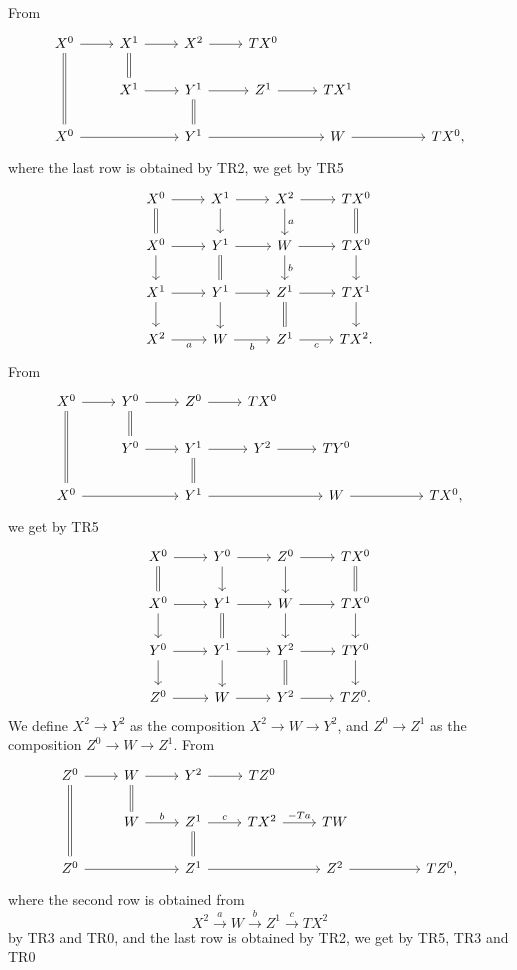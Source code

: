 \documentclass[12pt]{article}
\theoremstyle{remark}
\begin{document}
From 
$$
\begin{tikzcd}
X^0\ar[equal]{dd}\ar{r}&X^1\ar[equal]{d}\ar{r}&X^2\ar{r}&TX^0\\
&X^1\ar{r}&Y^1\ar[equal]{d}\ar{r}&Z^1\ar{r}&TX^1\\
X^0\ar{rr}&&Y^1\ar{rr}&&W\ar{rr}&&TX^0,
\end{tikzcd}
$$
where the last row is obtained by TR2, we get by TR5
\begin{equation}\label{v1}
\begin{tikzcd}
X^0\ar{r}\ar[equal]{d}&X^1\ar{d}\ar{r}&X^2\ar{d}{a}\ar{r}&TX^0\ar[equal]{d}\\
X^0\ar{d}\ar{r}&Y^1\ar{r}\ar[equal]{d}&W\ar{d}{b}\ar{r}&TX^0\ar{d}\\
X^1\ar{d}\ar{r}&Y^1\ar{d}\ar{r}&Z^1\ar{r}\ar[equal]{d}&TX^1\ar{d}\\
X^2\ar{r}[swap]{a}&W\ar{r}[swap]{b}&Z^1\ar{r}[swap]{c}&TX^2.
\end{tikzcd}
\end{equation}
%
From 
$$
\begin{tikzcd}
X^0\ar[equal]{dd}\ar{r}&Y^0\ar[equal]{d}\ar{r}&Z^0\ar{r}&TX^0\\
&Y^0\ar{r}&Y^1\ar[equal]{d}\ar{r}&Y^2\ar{r}&TY^0\\
X^0\ar{rr}&&Y^1\ar{rr}&&W\ar{rr}&&TX^0,
\end{tikzcd}
$$
we get by TR5
\begin{equation}\label{v2}
\begin{tikzcd}
X^0\ar{r}\ar[equal]{d}&Y^0\ar{d}\ar{r}&Z^0\ar{d}\ar{r}&TX^0\ar[equal]{d}\\
X^0\ar{d}\ar{r}&Y^1\ar{r}\ar[equal]{d}&W\ar{d}\ar{r}&TX^0\ar{d}\\
Y^0\ar{d}\ar{r}&Y^1\ar{d}\ar{r}&Y^2\ar{r}\ar[equal]{d}&TY^0\ar{d}\\
Z^0\ar{r}&W\ar{r}&Y^2\ar{r}&TZ^0.
\end{tikzcd}
\end{equation}
%
We define $X^2\to Y^2$ as the composition $X^2\to W\to Y^2$, and $Z^0\to Z^1$ as the composition $Z^0\to W\to Z^1$. From 
$$
\begin{tikzcd}
Z^0\ar[equal]{dd}\ar{r}&W\ar[equal]{d}\ar{r}&Y^2\ar{r}&TZ^0\\
&W\ar{r}{b}&Z^1\ar[equal]{d}\ar{r}{c}&TX^2\ar{r}{-Ta}&TW\\
Z^0\ar{rr}&&Z^1\ar{rr}&&Z^2\ar{rr}&&TZ^0,
\end{tikzcd}
$$
where the second row is obtained from 
$$
X^2\overset{a}{\to}W\overset{b}{\to}Z^1\overset{c}{\to}TX^2
$$
by TR3 and TR0, and the last row is obtained by TR2, we get by TR5, TR3 and TR0
\end{document}
